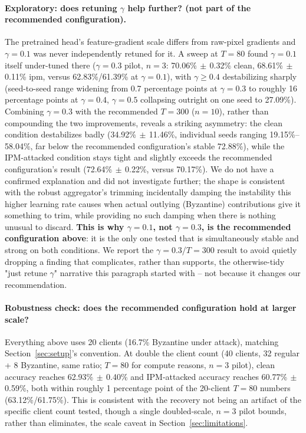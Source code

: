 \documentclass{article}
\begin{document}
\paragraph{Exploratory: does retuning $\gamma$ help further? (not part of the
recommended configuration).} The pretrained head's feature-gradient scale
differs from raw-pixel gradients and $\gamma{=}0.1$ was never independently
retuned for it. A sweep at $T{=}80$ found $\gamma{=}0.1$ itself under-tuned
there ($\gamma{=}0.3$ pilot, $n{=}3$: 70.06\%$\,\pm\,$0.32\% clean,
68.61\%$\,\pm\,$0.11\% ipm, versus 62.83\%/61.39\% at $\gamma{=}0.1$), with
$\gamma \geq 0.4$ destabilizing sharply (seed-to-seed range widening from 0.7
percentage points at $\gamma{=}0.3$ to roughly 16 percentage points at
$\gamma{=}0.4$, $\gamma{=}0.5$ collapsing outright on one seed to 27.09\%).
Combining $\gamma{=}0.3$ with the recommended $T{=}300$ ($n{=}10$), rather than
compounding the two improvements, reveals a striking asymmetry: the clean
condition destabilizes badly (34.92\%$\,\pm\,$11.46\%, individual seeds ranging
19.15\%--58.04\%, far below the recommended configuration's stable 72.88\%),
while the IPM-attacked condition stays tight and slightly exceeds the
recommended configuration's result (72.64\%$\,\pm\,$0.22\%, versus 70.17\%). We
do not have a confirmed explanation and did not investigate further; the shape
is consistent with the robust aggregator's trimming incidentally damping the
instability this higher learning rate causes when actual outlying (Byzantine)
contributions give it something to trim, while providing no such damping when
there is nothing unusual to discard. \textbf{This is why $\gamma{=}0.1$, not
$\gamma{=}0.3$, is the recommended configuration above}: it is the only one
tested that is simultaneously stable and strong on both conditions. We report
the $\gamma{=}0.3$/$T{=}300$ result to avoid quietly dropping a finding that
complicates, rather than supports, the otherwise-tidy "just retune $\gamma$"
narrative this paragraph started with -- not because it changes our
recommendation.

\paragraph{Robustness check: does the recommended configuration hold at larger
scale?} Everything above uses 20 clients (16.7\% Byzantine under attack),
matching Section~\ref{sec:setup}'s convention. At double the client count (40
clients, 32 regular + 8 Byzantine, same ratio; $T{=}80$ for compute reasons,
$n{=}3$ pilot), clean accuracy reaches 62.93\%$\,\pm\,$0.40\% and IPM-attacked
accuracy reaches 60.77\%$\,\pm\,$0.59\%, both within roughly 1 percentage point
of the 20-client $T{=}80$ numbers (63.12\%/61.75\%). This is consistent with
the recovery not being an artifact of the specific client count tested, though
a single doubled-scale, $n{=}3$ pilot bounds, rather than eliminates, the scale
caveat in Section~\ref{sec:limitations}.
\end{document}
